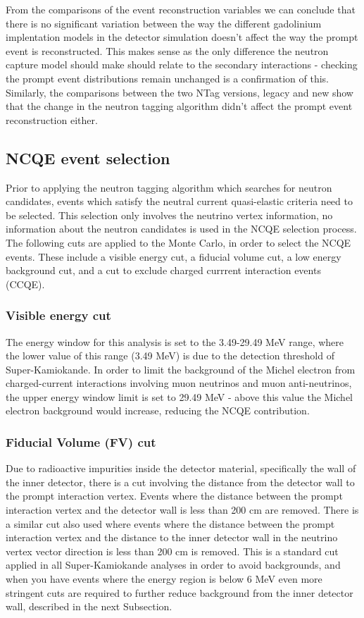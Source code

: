 From the comparisons of the event reconstruction variables we can conclude that there is no significant variation between the way the different gadolinium implentation models in the detector simulation doesn't affect the way the prompt event is reconstructed. This makes sense as the only difference the neutron capture model should make should relate to the secondary interactions - checking the prompt event distributions remain unchanged is a confirmation of this. Similarly, the comparisons between the two NTag versions, legacy and new show that the change in the neutron tagging algorithm didn't affect the prompt event reconstruction either. 


\subsection{NCQE event selection}

Prior to applying the neutron tagging algorithm which searches for neutron candidates, events which satisfy the neutral current quasi-elastic criteria need to be selected. This selection only involves the neutrino vertex information, no information about the neutron candidates is used in the NCQE selection process. 
\newline
The following cuts are applied to the Monte Carlo, in order to select the NCQE events. These include a visible energy cut, a fiducial volume cut, a low energy background cut, and a cut to exclude charged currrent interaction events (CCQE). 

\subsubsection{Visible energy cut}
The energy window for this analysis is set to the 3.49-29.49 MeV range, where the lower value of this range (3.49 MeV) is due to the detection threshold of Super-Kamiokande. In order to limit the background of the Michel electron from charged-current interactions involving muon neutrinos and muon anti-neutrinos, the upper energy window limit is set to 29.49 MeV - above this value the Michel electron background would increase, reducing the NCQE contribution. 

\subsubsection{Fiducial Volume (FV) cut}
Due to radioactive impurities inside the detector material, specifically the wall of the inner detector, there is a cut involving the distance from the detector wall to the prompt interaction vertex. Events where the distance between the prompt interaction vertex and the detector wall is less than 200 cm are removed. There is a similar cut also used where events where the distance between the prompt interaction vertex and the distance to the inner detector wall in the neutrino vertex vector direction is less than 200 cm is removed. This is a standard cut applied in all Super-Kamiokande analyses in order to avoid backgrounds, and when you have events where the energy region is below 6 MeV even more stringent cuts are required to further reduce background from the inner detector wall, described in the next Subsection. 

